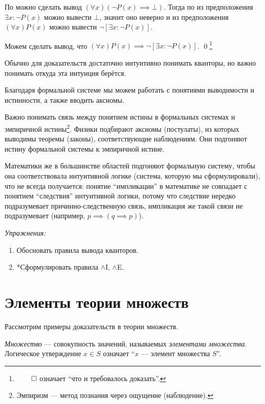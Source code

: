 По \Aii{} можно сделать вывод $(\forall x)(\lnot P(x)\implies\bot)$.
Тогда по \Eee{} из предположения ${\exists x:\lnot P(x)}$ можно вывести $\bot$,
значит оно неверно и из предположения $(\forall x)P(x)$
можно вывести $\lnot[\exists x:\lnot P(x)]$.

Можем сделать вывод, что $(\forall x)P(x)\implies \lnot[\exists x:\lnot P(x)]$.
\qed\footnote{$\qed$ означает ``что и требовалось доказать''.}

Обычно для доказательств достаточно интуитивно понимать кванторы,
но важно понимать откуда эта интуиция берётся.

Благодаря формальной системе мы можем работать с понятиями выводимости
и истинности, а также вводить аксиомы.

Важно понимать связь между понятием истины в формальных системах
и эмпиричной истины\footnote{Эмпиризм --- метод познания через ощущение (наблюдение).}.
Физики подбирают аксиомы (постулаты),
из которых выводимы теоремы (законы), соответствующие наблюдениям.
Они подгоняют истину формальной системы к эмпиричной истине.

Математики же
в большинстве областей подгоняют формальную систему,
чтобы она соответствовала интуитивной логике (система, которую мы сформулировали),
что не всегда получается: понятие ``импликации'' в математике не совпадает
с понятием ``следствия'' интуитивной логики, потому что следствие
нередко подразумевает причинно-следственную
связь, импликация же такой связи не подразумевает (например, ${p\implies(q\implies p)}$).

	{\it Упражнения:}

\begin{enumerate}
	\item{}Обосновать правила вывода кванторов.

	\item{}*Сформулировать правила $\land$I, $\land$E.
\end{enumerate}

\pagebreak

\section{Элементы теории множеств}

Рассмотрим примеры доказательств в теории множеств.

{\it Множество} --- совокупность значений, называемых {\it элементами множества}.
Логическое утверждение $x\in S$ означает ``$x$ --- элемент множества $S$''.

